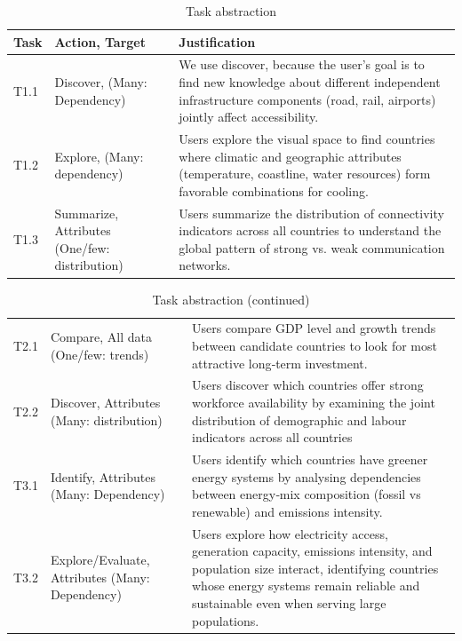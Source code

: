 \documentclass{vgtc}                          %
\begin{document}
\begin{table}[H]
\centering
\setlength{\tabcolsep}{2pt} 
\caption{Task abstraction}
\begin{tabular}{p{} p{} p{}}
\textbf{Task} & \textbf{Action, Target} & \textbf{Justification} \\
\hline

T1.1 & Discover, (Many: Dependency) &
We use discover, because the user’s goal is to find new knowledge about different independent infrastructure components (road, rail, airports) jointly affect accessibility. \\[0.2em]

T1.2 & Explore, (Many: dependency) &
Users explore the visual space to find countries where climatic and geographic attributes (temperature, coastline, water resources) form favorable combinations for cooling. \\[0.2em]

T1.3 & Summarize, Attributes (One/few: distribution) &
Users summarize the distribution of connectivity indicators across all countries to understand the global pattern of strong vs. weak communication networks. \\[0.4em]

\end{tabular}
\end{table}

\begin{table}[H]
\ContinuedFloat
\centering
\setlength{\tabcolsep}{2pt} 
\caption[]{Task abstraction (continued)}
\begin{tabular}{p{} p{} p{}}

T2.1 & Compare, All data (One/few: trends) &
Users compare GDP level and growth trends between candidate countries to look for most attractive long‑term investment. \\[0.2em]

T2.2 & Discover, Attributes (Many: distribution) &
Users discover which countries offer strong workforce availability by examining the joint distribution of demographic and labour indicators across all countries \\[0.4em]

T3.1 & Identify, Attributes (Many: Dependency) &
Users identify which countries have greener energy systems by analysing dependencies between energy‑mix composition (fossil vs renewable) and emissions intensity. \\[0.2em]

T3.2 & Explore/Evaluate, Attributes (Many: Dependency) &
Users explore how electricity access, generation capacity, emissions intensity, and population size interact, identifying countries whose energy systems remain reliable and sustainable even when serving large populations. \\

\end{tabular}
\end{table}
\end{document}
